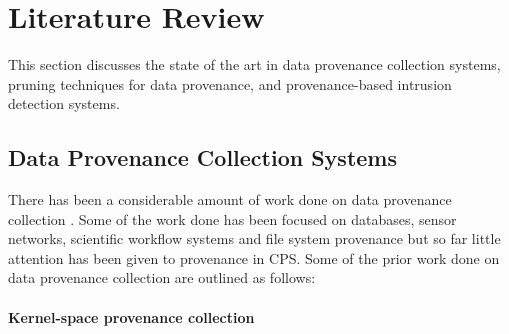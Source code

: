 


\chapter{Literature Review}\label{background}

This section discusses the state of the art in data provenance collection systems, pruning techniques for data provenance, and provenance-based intrusion detection systems.


\section{Data Provenance Collection Systems}

There has been a considerable amount of work done on data provenance collection \cite{ bates_trustworthy_2015, gessiou_towards_2012, _general-purpose_2012, muniswamy_reddy_provenance_2010}. Some of the work done has been focused on databases, sensor networks, scientific workflow systems and file system provenance but so far little attention has been given to provenance in CPS. Some of the prior work done on data provenance collection are outlined as follows:




\subsubsection{Kernel-space provenance collection}

